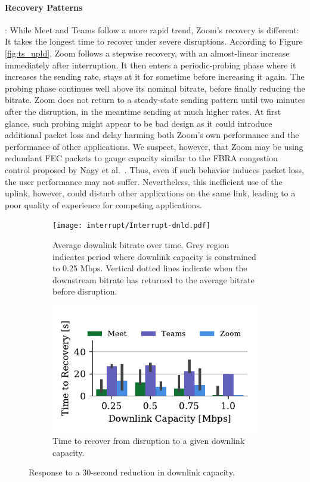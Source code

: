 \paragraph{Recovery Patterns}: While Meet and Teams follow a more rapid trend,
Zoom's recovery is different: It takes the longest time to recover under
severe disruptions. According to Figure \ref{fig:ts_upld}, Zoom follows a
stepwise recovery, with an almost-linear increase immediately after
interruption. It then enters a periodic-probing phase where it increases
the sending rate, stays at it for sometime before increasing it again. The
probing phase continues well above its nominal bitrate, before finally
reducing the bitrate.  Zoom does not return to a steady-state sending pattern
until two minutes after the disruption, in the meantime sending at much higher
rates. At first glance, such probing might appear to be bad design as it could
introduce additional packet loss and delay harming both Zoom's own performance
and the performance of other applications.  We suspect, however, that Zoom may
be using redundant FEC packets to gauge capacity similar to the
FBRA congestion control proposed by Nagy et al.~\cite{nagy2014congestion}.
Thus, even if such behavior induces packet loss, the user performance may not
suffer. Nevertheless, this inefficient use of the uplink, however, could
disturb other applications on the same link, leading to a poor quality of
experience for competing applications. 

\begin{figure}[t!]
 \centering
\begin{subfigure}[t]{.5\textwidth}
   \centering
    \texttt{[image: interrupt/Interrupt-dnld.pdf]}
    \caption{Average downlink bitrate over time. Grey region indicates period where downlink capacity is constrained to 0.25 Mbps. Vertical dotted lines indicate when the downstream bitrate has returned to the average bitrate before disruption.}
    \label{fig:ts-dnld}
\end{subfigure}
\begin{subfigure}[t]{.5\textwidth}
  \centering
    \includegraphics[width=.7\textwidth,keepaspectratio]{figures/interrupt/TTR-dnld.pdf}
    \caption{Time to recover from disruption to a given downlink capacity.}
    \label{fig:TTR_dnld}
\end{subfigure}
\caption{Response to a 30-second reduction in downlink capacity.}
\label{fig:interrupt-dnld}
\end{figure}

